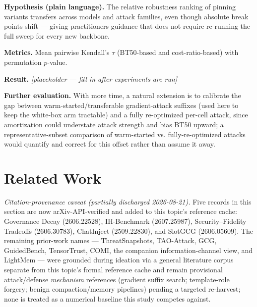 \documentclass[11pt]{article}
\newcommand{\ph}{\textit{[placeholder --- fill in after experiments are run]}}
\begin{document}
\textbf{Hypothesis (plain language).} The relative robustness ranking of pinning variants transfers across models and attack families, even though absolute break points shift --- giving practitioners guidance that does not require re-running the full sweep for every new backbone.

\textbf{Metrics.} Mean pairwise Kendall's $\tau$ (BT50-based and cost-ratio-based) with permutation $p$-value.

\textbf{Result.} \ph

\vspace{0.5em}
\noindent\textbf{Further evaluation.} With more time, a natural extension is to calibrate the gap between warm-started/transferable gradient-attack suffixes (used here to keep the white-box arm tractable) and a fully re-optimized per-cell attack, since amortization could understate attack strength and bias BT50 upward; a representative-subset comparison of warm-started vs. fully-re-optimized attacks would quantify and correct for this offset rather than assume it away.

\section{Related Work}

\noindent\textit{Citation-provenance caveat (partially discharged 2026-08-21).} Five records in this section are now arXiv-API-verified and added to this topic's reference cache: Governance Decay (2606.22528), IH-Benchmark (2607.25987), Security--Fidelity Tradeoffs (2606.30783), ChatInject (2509.22830), and SlotGCG (2606.05609). The remaining prior-work names --- ThreatSnapshots, TAO-Attack, GCG, GuidedBench, TensorTrust, COMI, the companion information-channel view, and LightMem --- were grounded during ideation via a general literature corpus separate from this topic's formal reference cache and remain provisional attack/defense \emph{mechanism} references (gradient suffix search; template-role forgery; benign compaction/memory pipelines) pending a targeted re-harvest; none is treated as a numerical baseline this study competes against.
\end{document}
